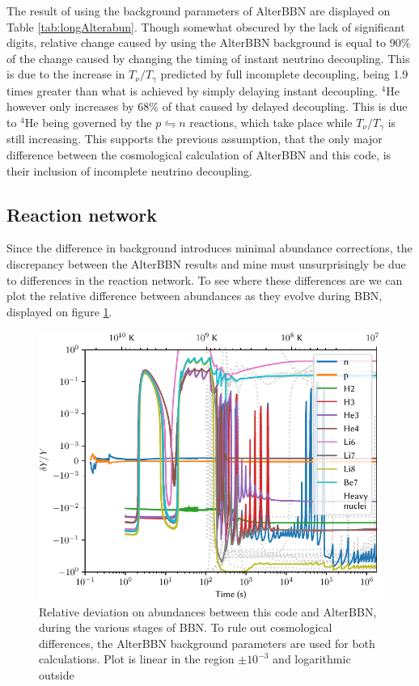 The result of using the background parameters of AlterBBN are displayed on Table \ref{tab:longAlterabun}. Though somewhat obscured by the lack of significant digits, relative change caused by using the AlterBBN background is equal to 90\% of the change caused by changing the timing of instant neutrino decoupling. This is due to the increase in $T_\nu/T_\gamma$ predicted by full incomplete decoupling, being 1.9 times greater than what is achieved by simply delaying instant decoupling. ${}^4$He however only increases by 68\% of that caused by delayed decoupling. This is due to ${}^4$He being governed by the $p\leftrightharpoons n$ reactions, which take place while $T_\nu/T_\gamma$ is still increasing. This supports the previous assumption, that the only major difference between the cosmological calculation of AlterBBN and this code, is their inclusion of incomplete neutrino decoupling.

\subsection{Reaction network}

Since the difference in background introduces minimal abundance corrections, the discrepancy between the AlterBBN results and mine must unsurprisingly be due to differences in the reaction network. To see where these differences are we can plot the relative difference between abundances as they evolve during BBN, displayed on figure \ref{fig:AlterBBNdeltaY}. 
\begin{figure}[ht]
    \includegraphics[width=5.1in]{figures/AlterBBNdeltaY.pdf}
    \caption{Relative deviation on abundances between this code and AlterBBN, during the various stages of BBN. To rule out cosmological differences, the AlterBBN background parameters are used for both calculations. Plot is linear in the region $\pm 10^{-3}$ and logarithmic outside}
    \label{fig:AlterBBNdeltaY}
\end{figure}


